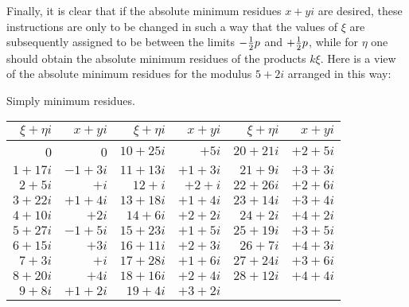 \documentclass[twoside,12pt, showframe]{memoir}
\let\oldfrac\frac
\def\frac#1#2{\mathchoice{\tfrac{#1}{#2}}{\oldfrac{#1}{#2}}{\genfrac{}{}{}{2}{#1}{#2\mathstrut}}{\genfrac{}{}{}{3}{#1}{#2\mathstrut}}}
\begin{document}
Finally, it is clear that if the absolute minimum residues \(x+yi\) are desired, these instructions are only to be changed in such a way that the values of \(\xi\) are subsequently assigned to be between the limits \(-\frac{1}{2} p\) and \(+\frac{1}{2} p\), while for \(\eta\) one should obtain the absolute minimum residues of the products \(k\xi\). Here is a view of the absolute minimum residues for the modulus \(5+2i\) arranged in this way:
\begin{center}
Simply minimum residues.\\
\begin{tabular}{r|r||r|r||r|r}
\(\xi+\eta i\) & \(x+yi\) & \(\xi+\eta i\) & \(x+yi\) & \(\xi+\eta i\) & \(x+yi\) \\
\hline
0 & 0 & \(10+25i\) & \(+5i\) & \(20+21i\) & \(+2+5i\) \\
\(1+17i\) & \(-1+3i\) & \(11+13i\) & \(+1+3i\) & \(21+9i\) & \(+3+3i\) \\
\(2+5i\) & \(+i\) & \(12+i\) & \(+2+i\) & \(22+26i\) & \(+2+6i\) \\
\(3+22i\) & \(+1+4i\) & \(13+18i\) & \(+1+4i\) & \(23+14i\) & \(+3+4i\) \\
\(4+10i\) & \(+2i\) & \(14+6i\) & \(+2+2i\) & \(24+2i\) & \(+4+2i\) \\
\(5+27i\) & \(-1+5i\) & \(15+23i\) & \(+1+5i\) & \(25+19i\) & \(+3+5i\) \\
\(6+15i\) & \(+3i\) & \(16+11i\) & \(+2+3i\) & \(26+7i\) & \(+4+3i\) \\
\(7+3i\) & \(+i\) & \(17+28i\) & \(+1+6i\) & \(27+24i\) & \(+3+6i\) \\
\(8+20i\) & \(+4i\) & \(18+16i\) & \(+2+4i\) & \(28+12i\) & \(+4+4i\) \\
\(9+8i\) & \(+1+2i\) & \(19+4i\) & \(+3+2i\) &\multicolumn{2}{c}{} \\
\end{tabular}
\end{center}\clearpage\noindent%
\end{document}
